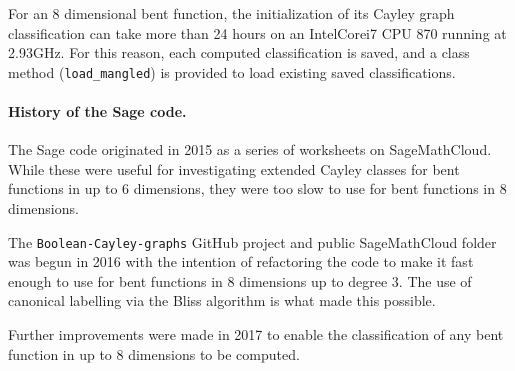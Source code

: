 \documentclass[12pt,a4paper]{article}
\begin{document}
For an 8 dimensional bent function, the initialization of its Cayley graph classification
can take more than 24 hours on an Intel\textregistered Core\texttrademark i7 CPU 870 running at 2.93GHz.
For this reason, each computed classification is saved, and a class method (\texttt{load\_mangled})
is provided to load existing saved classifications.

\paragraph*{History of the Sage code.}

The Sage code originated in 2015 as a series of worksheets on Sage\-Math\-Cloud.
While these were useful for investigating extended Cayley classes for bent functions in up to 6 dimensions,
they were too slow to use for bent functions in 8 dimensions.

The \texttt{Boolean-Cayley-graphs} GitHub project and public Sage\-Math\-Cloud folder was begun in 2016
with the intention of refactoring the code to make it fast enough to use for bent functions in 8 dimensions
up to degree 3.
The use of canonical labelling via the Bliss algorithm is what made this possible.

Further improvements were made in 2017 to enable the classification of any bent function in up to 8 dimensions
to be computed.
\end{document}
